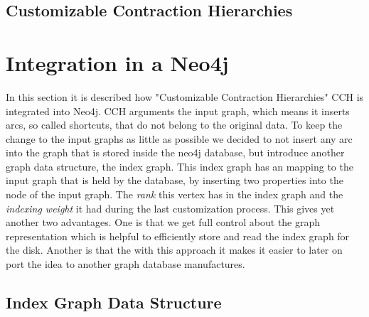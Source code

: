 \documentclass[11pt, rgb]{scrreprt}
\begin{document}
\section{Customizable Contraction Hierarchies}\label{sec:Preliminary_CCH}

\chapter{Integration in a Neo4j}

In this section it is described how "Customizable Contraction Hierarchies" CCH is integrated into Neo4j. CCH arguments the input graph, which means it inserts arcs, so called shortcuts, that do not belong to the original data. To keep the change to the input graphs as little as possible we decided to not insert any arc into the graph that is stored inside the neo4j database, but introduce another graph data structure, the index graph. This index graph has an mapping to the input graph that is held by the database, by inserting two properties into the node of the input graph. The \textit{rank} this vertex has in the index graph and the \textit{indexing weight} it had during the last customization process. This gives yet another two advantages. One is that we get full control about the graph representation which is helpful to efficiently store and read the index graph for the disk. Another is that the with this approach it makes it easier to later on port the idea to another graph database manufactures.

\section{Index Graph Data Structure}
\end{document}
